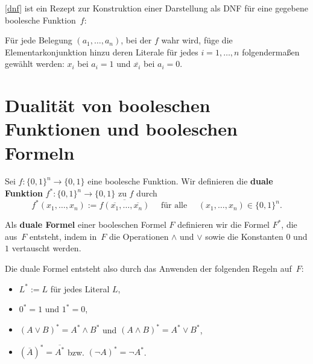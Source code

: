 \begin{bem} \label{dnf:rezept}
	\eqref{dnf} ist ein Rezept zur Konstruktion einer Darstellung als DNF für eine gegebene boolesche Funktion~$f$:
	
	 Für jede Belegung $(a_1,\ldots,a_n)$, bei der $f$ wahr wird, füge die Elementarkonjunktion hinzu deren Literale für jedes $i=1,\ldots,n$ folgendermaßen  gewählt werden: $x_i$ bei $a_i=1$ und $\overline{x_i}$ bei $a_i=0$. 
\end{bem} 


\section{Dualität von booleschen Funktionen und booleschen Formeln} 

\begin{defn}
	Sei $f : \{0,1\}^n \to \{0,1\}$ eine boolesche Funktion. Wir definieren die \textbf{duale Funktion} $f^\ast : \{0,1\}^n \to \{0,1\}$ zu $f$ durch 
	\[
	f^\ast(x_1,\ldots,x_n) := \overline{ f(\overline{x_1},\ldots,\overline{x_n})} \quad \text{ für alle } \quad (x_1,\ldots,x_n) \in \{0,1\}^n.
	\]
\end{defn} 


\begin{defn}
	Als \textbf{duale Formel} einer booleschen Formel $F$ definieren wir die Formel $F^\ast$, die aus~$F$ entsteht, indem in~$F$ die Operationen $\wedge$ und $\vee$ sowie die Konstanten $0$ und $1$ vertauscht werden.
	
	Die duale Formel entsteht also durch das Anwenden der folgenden Regeln auf~$F$:
	\begin{itemize} 
		\item $L^\ast := L$ für jedes Literal $L$,
		\item $0^\ast = 1$ und $1^\ast = 0$,
		\item $(A \vee B)^\ast = A^\ast \wedge B^\ast$ und $(A \wedge B)^\ast = A^\ast \vee B^\ast$,
		\item $(\overline{A})^\ast = \overline{A^\ast}$ bzw. $(\neg{A})^\ast = \neg{A^\ast}$.
	\end{itemize}  
\end{defn} 

